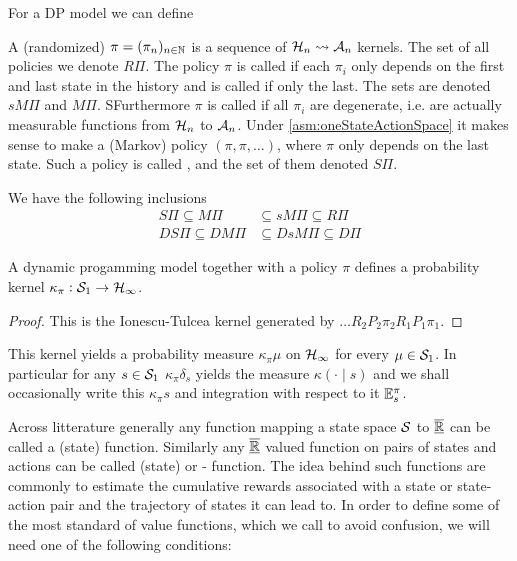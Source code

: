 For a DP model we can define
\begin{defn}[Policy]
  A (randomized)  $\pi = (\pi_n)_{n \in \mathbb{N}}$
  is a sequence of $\mathcal{H}_n \leadsto \mathcal{A}_n$ kernels.
  The set of all policies we denote $R\Pi$.
  The policy $\pi$ is called  if each $\pi_i$ only depends
  on the first and last state in the history
  and is called  if only the last.
  The sets are denoted $sM\Pi$ and $M\Pi$.
 SFurthermore $\pi$ is called  if all $\pi_i$
  are degenerate, i.e. are actually measurable functions from
  $\mathcal{H}_n$ to $\mathcal{A}_n$. 
  Under \cref{asm:oneStateActionSpace}
  it makes sense to make a (Markov) policy $(\pi, \pi, \dots)$,
  where $\pi$ only depends on the last state.
  Such a policy is called ,
  and the set of them denoted $S\Pi$.
\end{defn}
We have the following inclusions
\begin{align*}
  S\Pi \subseteq M\Pi &\subseteq sM\Pi \subseteq R\Pi
  \\ DS\Pi \subseteq DM\Pi &\subseteq DsM\Pi \subseteq D\Pi
\end{align*}

\begin{prop}
A dynamic progamming model together with a policy $\pi$ defines a
probability kernel $\kappa_\pi : \mathcal{S}_1 \to \mathcal{H}_\infty$.
\end{prop}
\begin{proof}
  This is the Ionescu-Tulcea kernel generated by
  $\dots R_2 P_2 \pi_2 R_1 P_1 \pi_1$.
\end{proof}
This kernel yields a probability measure $\kappa_\pi \mu$ on $\mathcal{H}_\infty$
for every $\mu \in \mathcal{S}_1$. In particular for any $s \in \mathcal{S}_1$
$\kappa_\pi \delta_s$ yields the measure $\kappa(\cdot \mid s)$
and we shall occasionally write this $\kappa_\pi s$ and
integration with respect to it $\mathbb{E}^\pi_s$.

Across litterature generally %
any function mapping a state space $\mathcal{S}$ to $\overline{\underline{\mathbb{R}}}$
can be called a (state)
 function. Similarly any $\underline{\overline{\mathbb{R}}}$ valued function
on pairs of states and actions can be called (state)
 or - function.
The idea behind such functions are commonly to estimate the
cumulative rewards associated with a state or state-action pair
and the trajectory of states it can lead to.
In order to define some of the most standard of value functions,
which we call  to avoid confusion, we will need one of
the following conditions:


